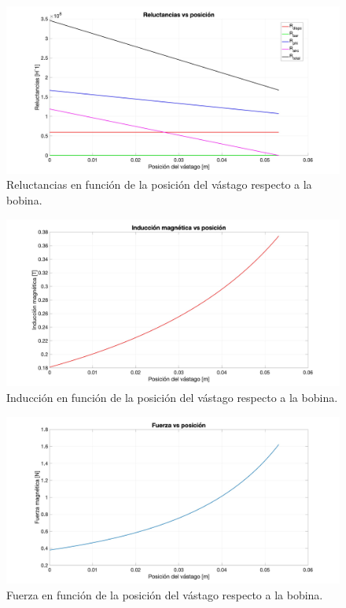 \begin{figure}[H]
    \centering
    \includegraphics[width=\linewidth]{FigurasMemoria/calcRsetupBase.jpg}
    \caption{Reluctancias en función de la posición del vástago respecto a la bobina.}
    \label{fig:calcRsetupBase} %
\end{figure}

\begin{figure}[H]
    \centering
    \includegraphics[width=\linewidth]{FigurasMemoria/calcBsetupBase.jpg}
    \caption{Inducción en función de la posición del vástago respecto a la bobina.}
    \label{fig:calcBsetupBase} %
\end{figure}

\begin{figure}[H]
    \centering
    \includegraphics[width=\linewidth]{FigurasMemoria/calcFsetupBase.jpg}
    \caption{Fuerza en función de la posición del vástago respecto a la bobina.}
    \label{fig:calcFsetupBase} %
\end{figure}

